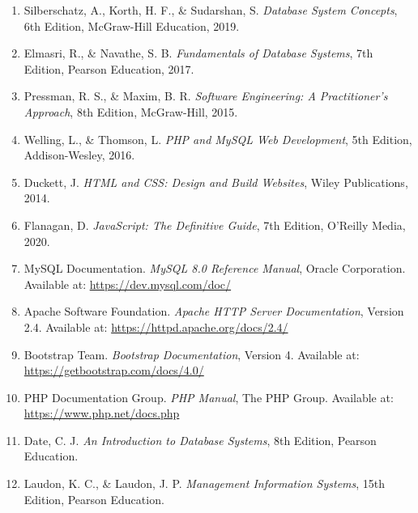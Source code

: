 \documentclass[12pt,a4paper]{report}
\begin{document}
\newpage
\begin{enumerate}
\item Silberschatz, A., Korth, H. F., \& Sudarshan, S. \textit{Database System Concepts}, 6th Edition, McGraw-Hill Education, 2019.

\item Elmasri, R., \& Navathe, S. B. \textit{Fundamentals of Database Systems}, 7th Edition, Pearson Education, 2017.

\item Pressman, R. S., \& Maxim, B. R. \textit{Software Engineering: A Practitioner's Approach}, 8th Edition, McGraw-Hill, 2015.

\item Welling, L., \& Thomson, L. \textit{PHP and MySQL Web Development}, 5th Edition, Addison-Wesley, 2016.

\item Duckett, J. \textit{HTML and CSS: Design and Build Websites}, Wiley Publications, 2014.

\item Flanagan, D. \textit{JavaScript: The Definitive Guide}, 7th Edition, O'Reilly Media, 2020.

\item MySQL Documentation. \textit{MySQL 8.0 Reference Manual}, Oracle Corporation. Available at: \url{https://dev.mysql.com/doc/}

\item Apache Software Foundation. \textit{Apache HTTP Server Documentation}, Version 2.4. Available at: \url{https://httpd.apache.org/docs/2.4/}

\item Bootstrap Team. \textit{Bootstrap Documentation}, Version 4. Available at: \url{https://getbootstrap.com/docs/4.0/}

\item PHP Documentation Group. \textit{PHP Manual}, The PHP Group. Available at: \url{https://www.php.net/docs.php}

\item Date, C. J. \textit{An Introduction to Database Systems}, 8th Edition, Pearson Education.

\item Laudon, K. C., \& Laudon, J. P. \textit{Management Information Systems}, 15th Edition, Pearson Education.
\end{enumerate}
\end{document}
